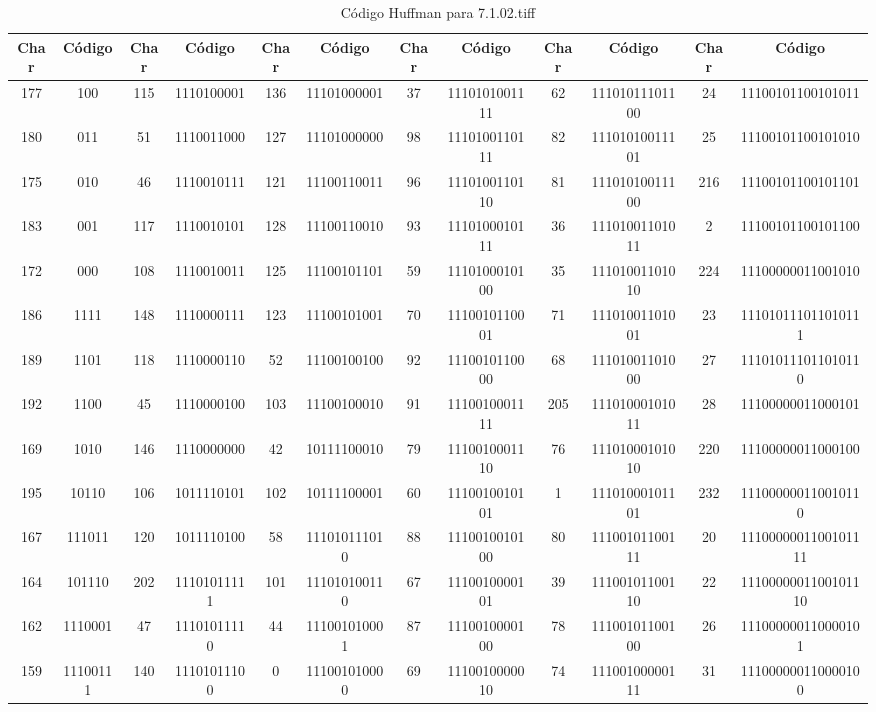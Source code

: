 \documentclass[conference,onecolumn,12pt]{IEEEtran}
\numberwithin{equation}{subsection}
\begin{document}
\begin{itemize}
\begin{table}[H]
\centering
\caption{Código Huffman para 7.1.02.tiff}
\label{tab:huffman_7.1.02.tiff}
\begin{tabular}{cccccccccccc}
\toprule
\textbf{Char} & \textbf{Código} & \textbf{Char} & \textbf{Código} & \textbf{Char} & \textbf{Código} & \textbf{Char} & \textbf{Código} & \textbf{Char} & \textbf{Código} & \textbf{Char} & \textbf{Código} \\
\midrule
177 & 100 & 115 & 1110100001 & 136 & 11101000001 & 37 & 1110101001111 & 62 & 11101011101100 & 24 & 11100101100101011 \\
180 & 011 & 51 & 1110011000 & 127 & 11101000000 & 98 & 1110100110111 & 82 & 11101010011101 & 25 & 11100101100101010 \\
175 & 010 & 46 & 1110010111 & 121 & 11100110011 & 96 & 1110100110110 & 81 & 11101010011100 & 216 & 11100101100101101 \\
183 & 001 & 117 & 1110010101 & 128 & 11100110010 & 93 & 1110100010111 & 36 & 11101001101011 & 2 & 11100101100101100 \\
172 & 000 & 108 & 1110010011 & 125 & 11100101101 & 59 & 1110100010100 & 35 & 11101001101010 & 224 & 11100000011001010 \\
186 & 1111 & 148 & 1110000111 & 123 & 11100101001 & 70 & 1110010110001 & 71 & 11101001101001 & 23 & 111010111011010111 \\
189 & 1101 & 118 & 1110000110 & 52 & 11100100100 & 92 & 1110010110000 & 68 & 11101001101000 & 27 & 111010111011010110 \\
192 & 1100 & 45 & 1110000100 & 103 & 11100100010 & 91 & 1110010001111 & 205 & 11101000101011 & 28 & 11100000011000101 \\
169 & 1010 & 146 & 1110000000 & 42 & 10111100010 & 79 & 1110010001110 & 76 & 11101000101010 & 220 & 11100000011000100 \\
195 & 10110 & 106 & 1011110101 & 102 & 10111100001 & 60 & 1110010010101 & 1 & 11101000101101 & 232 & 111000000110010110 \\
167 & 111011 & 120 & 1011110100 & 58 & 111010111010 & 88 & 1110010010100 & 80 & 11100101100111 & 20 & 1110000001100101111 \\
164 & 101110 & 202 & 11101011111 & 101 & 111010100110 & 67 & 1110010000101 & 39 & 11100101100110 & 22 & 1110000001100101110 \\
162 & 1110001 & 47 & 11101011110 & 44 & 111001010001 & 87 & 1110010000100 & 78 & 11100101100100 & 26 & 111000000110000101 \\
159 & 11100111 & 140 & 11101011100 & 0 & 111001010000 & 69 & 1110010000010 & 74 & 11100100000111 & 31 & 111000000110000100 \\

\end{tabular}
\end{table}
\end{itemize}
\end{document}
